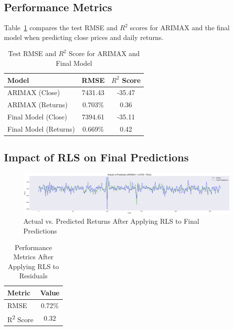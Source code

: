 \subsection{Performance Metrics}
Table~\ref{tab:performance_arimax_final} compares the test RMSE and \( R^2 \) scores for ARIMAX and the final model when predicting close prices and daily returns.

\begin{table}[h!]
\centering
\caption{Test RMSE and \( R^2 \) Score for ARIMAX and Final Model}
\label{tab:performance_arimax_final}
\begin{tabular}{|l|c|c|}
\hline
\textbf{Model} & \textbf{RMSE} & \textbf{\( R^2 \) Score} \\ \hline
ARIMAX (Close) & 7431.43 & -35.47 \\ \hline
ARIMAX (Returns) & 0.703\% & 0.36 \\ \hline
Final Model (Close) & 7394.61 & -35.11 \\ \hline
Final Model (Returns) & 0.669\% & 0.42 \\ \hline
\end{tabular}
\end{table}

\subsection{Impact of RLS on Final Predictions}

\begin{figure}[h!]
    \centering
    \includegraphics[width=\textwidth]{Images/6_Final_Pred.pdf}
    \caption{Actual vs. Predicted Returns After Applying RLS to Final Predictions}
    \label{fig:rls_on_residuals}
\end{figure}

\begin{table}[h!]
\centering
\caption{Performance Metrics After Applying RLS to Residuals}
\label{tab:rls_residuals_performance}
\begin{tabular}{|l|c|}
\hline
\textbf{Metric}   & \textbf{Value}  \\ \hline
RMSE              & 0.72\%  \\ \hline
R\textsuperscript{2} Score & 0.32  \\ \hline
\end{tabular}
\end{table}


